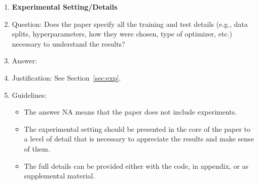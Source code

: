 \documentclass{article}
\begin{document}
\begin{enumerate}
\item {\bf Experimental Setting/Details}
    \item[] Question: Does the paper specify all the training and test details (e.g., data splits, hyperparameters, how they were chosen, type of optimizer, etc.) necessary to understand the results?
    \item[] Answer: \answerYes{} %
    \item[] Justification: See Section~\ref{sec:exp}.
    \item[] Guidelines:
    \begin{itemize}
        \item The answer NA means that the paper does not include experiments.
        \item The experimental setting should be presented in the core of the paper to a level of detail that is necessary to appreciate the results and make sense of them.
        \item The full details can be provided either with the code, in appendix, or as supplemental material.
    \end{itemize}


\end{enumerate}
\end{document}
